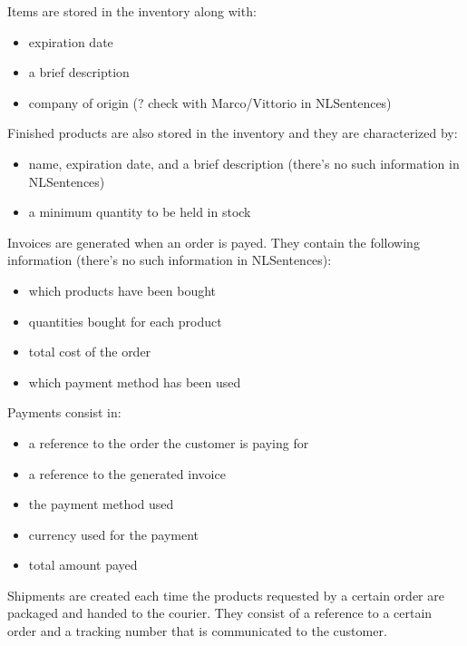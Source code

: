 Items are stored in the inventory along with:
\begin{itemize}
	\item expiration date
	\item a brief description
	\item company of origin (? check with Marco/Vittorio in NLSentences)
\end{itemize}
Finished products are also stored in the inventory and they are characterized by:
\begin{itemize}
	\item name, expiration date, and a brief description (there's no such information in NLSentences)
	\item a minimum quantity to be held in stock
\end{itemize}
Invoices are generated when an order is payed. They contain the following information (there's no such information in NLSentences):
\begin{itemize}
	\item which products have been bought
	\item quantities bought for each product
	\item total cost of the order
	\item which payment method has been used
\end{itemize}
Payments consist in:
\begin{itemize}
	\item a reference to the order the customer is paying for
	\item a reference to the generated invoice
	\item the payment method used
	\item currency used for the payment
	\item total amount payed
\end{itemize}
Shipments are created each time the products requested by a certain order are packaged and handed to the courier. They consist of a reference to a certain order and a tracking number that is communicated to the customer.